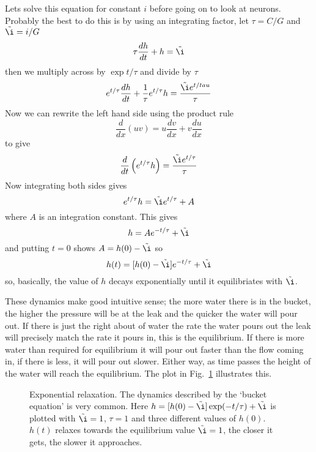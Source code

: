 \documentclass[11pt,a4paper]{scrartcl}
\begin{document}
Lets solve this equation for constant $i$ before going on to look at
neurons. Probably the best to do this is by using an integrating
factor, let $\tau=C/G$ and $\tilde{\i}=i/G$
\begin{equation}
\tau\frac{dh}{dt}+h=\tilde{\i}
\end{equation}
then we multiply across by $\exp{t/\tau}$ and divide by $\tau$
\begin{equation}
e^{t/\tau}\frac{dh}{dt}+\frac{1}{\tau}e^{t/\tau}h=\frac{\tilde{\i}e^{t/tau}}{\tau}
\end{equation}
Now we can rewrite the left hand side using the product rule
\begin{equation}
\frac{d}{dx}(uv)=u\frac{dv}{dx}+v\frac{du}{dx}
\end{equation}
to give
\begin{equation}
\frac{d}{dt}\left(e^{t/\tau}h\right)=\frac{\tilde{\i}e^{t/\tau}}{\tau}
\end{equation}
Now integrating both sides gives
\begin{equation}
e^{t/\tau}h=\tilde{\i}e^{t/\tau}+A
\end{equation}
where $A$ is an integration constant. This gives
\begin{equation}
h=Ae^{-t/\tau}+\tilde{\i}
\end{equation}
and putting $t=0$ shows $A=h(0)-\tilde{\i}$ so
\begin{equation}
h(t)=[h(0)-\tilde{\i}]e^{-t/\tau}+\tilde{\i}
\end{equation}
so, basically, the value of $h$ decays exponentially until it
equilibriates with $\tilde{\i}$.

These dynamics make good intuitive sense; the more water there is in
the bucket, the higher the pressure will be at the leak and the
quicker the water will pour out. If there is just the right about of
water the rate the water pours out the leak will precisely match the
rate it pours in, this is the equilibrium. If there is more water than
required for equilibrium it will pour out faster than the flow coming
in, if there is less, it will pour out slower. Either way, as time
passes the height of the water will reach the equilibrium. The plot in
Fig.~\ref{bucket_v} illustrates this.

\begin{figure}
\begin{center}

\end{center}
\caption{Exponential relaxation. The dynamics described by the
  \lq{}bucket equation\rq{} is very common. Here
  $h=[h(0)-\tilde{\i}]\exp(-t/\tau)+\tilde{\i}$ is plotted with
  $\tilde{\i}=1$, $\tau=1$ and three different values of
  $h(0)$. $h(t)$ relaxes towards the equilibrium value $\tilde{\i}=1$,
  the closer it gets, the slower it approaches.\label{bucket_v}}
\end{figure}
\end{document}
